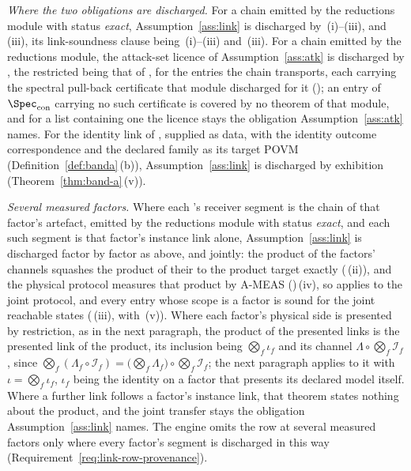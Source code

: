 \begin{remark}\label{rem:obligations-discharged}
\emph{Where the two obligations are discharged.} For a chain emitted by the
reductions module with status \emph{exact}, Assumption~\ref{ass:link} is
discharged by \,(i)--(iii),
 and \,(iii), its
link-soundness clause being \,(i)--(iii) and
\,(iii). For a chain emitted by the reductions
module, the attack-set licence of Assumption~\ref{ass:atk} is discharged by
, the restricted  being that of
, for the entries the chain transports, each
carrying the spectral pull-back certificate that module discharged for it
(); an entry of $\Spec_{\mathrm{con}}$ carrying
no such certificate is covered by no theorem of that module, and for a list
containing one the licence stays the obligation Assumption~\ref{ass:atk}
names. For the identity link of , supplied as data, with the
identity outcome correspondence and the declared family as its target POVM
(Definition~\ref{def:banda}\,(b)), Assumption~\ref{ass:link} is discharged
by exhibition (Theorem~\ref{thm:band-a}\,(v)).

\emph{Several measured factors.} Where each 's receiver
segment is the chain of that factor's artefact, emitted by the reductions
module with status \emph{exact}, and each such segment is that factor's
instance link alone, Assumption~\ref{ass:link} is discharged factor by factor
as above, and jointly: the product of the factors' channels squashes the
product of their  to the product target exactly
(\,(ii)), and the physical protocol
measures that product by A-MEAS ()\,(iv), so
 applies to the joint protocol, and every entry
whose scope is a factor is sound for the joint reachable states
(\,(iii), with
\,(v)). Where each factor's physical side is
presented by restriction, as in the next paragraph, the product of the
presented links is the presented link of the product, its inclusion being
$\bigotimes_f\iota_f$ and its channel $\Lambda\circ\bigotimes_f\mathcal{I}_f$,
since $\bigotimes_f(\Lambda_f\circ\mathcal{I}_f)
=\big(\bigotimes_f\Lambda_f\big)\circ\bigotimes_f\mathcal{I}_f$; the next
paragraph applies to it with $\iota=\bigotimes_f\iota_f$, $\iota_f$ being the
identity on a factor that presents its declared model itself. Where a further
link follows a factor's instance link, that theorem states nothing about the
product, and the joint transfer stays the obligation
Assumption~\ref{ass:link} names. The engine omits the row at several
measured factors only where every factor's segment is discharged in this way
(Requirement~\ref{req:link-row-provenance}).


\end{remark}
